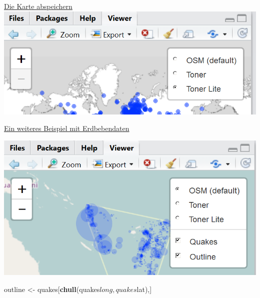 \documentclass[ignorenonframetext,]{beamer}
\newenvironment{Shaded}{}{}
\newcommand{\KeywordTok}[1]{\textcolor[rgb]{0.00,0.44,0.13}{\textbf{{#1}}}}
\newcommand{\StringTok}[1]{\textcolor[rgb]{0.25,0.44,0.63}{{#1}}}
\newcommand{\NormalTok}[1]{{#1}}
\begin{document}
\begin{frame}[fragile]{\href{http://www.r-bloggers.com/interactive-mapping-with-leaflet-in-r-2/}{Die
Karte abspeichern}}
\includegraphics{./tex2pdf.956/d0d87c36714c088a0ea49e8dc94a92978feef5a7.png}

\end{frame}

\begin{frame}[fragile]{\href{https://rstudio.github.io/leaflet/showhide.html}{Ein
weiteres Beispiel mit Erdbebendaten}}

\includegraphics{./tex2pdf.956/1e0bb66d5996be9e18cf42ff8105ba02512af5cc.png}

\begin{Shaded}
\begin{Highlighting}[]
\NormalTok{outline <-}\StringTok{ }\NormalTok{quakes[}\KeywordTok{chull}\NormalTok{(quakes$long, quakes$lat),]}
\end{Highlighting}
\end{Shaded}


\end{frame}
\end{document}
